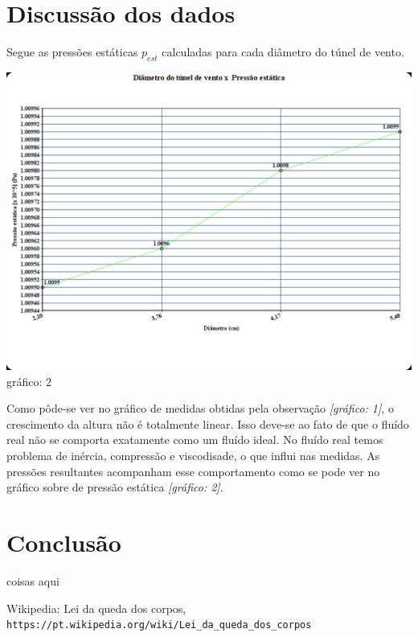 \documentclass[a4paper]{article}
\begin{document}
\section{Discussão dos dados}
    Segue as pressões estáticas $p_{est}$ calculadas para cada diâmetro do túnel de vento.
        \begin{center}
              \includegraphics[width=\linewidth]{img/graphPression.png}
              \label{graph}{gráfico: 2}
        \end{center}

        Como pôde-se ver no gráfico de medidas obtidas pela observação \textit{[gráfico: 1]}, o crescimento da altura não é totalmente linear. Isso deve-se ao fato de que o fluído real não se comporta exatamente como um fluído ideal. No fluído real temos problema de inércia, compressão e viscodisade, o que influi nas medidas. As pressões resultantes acompanham esse comportamento como se pode ver no gráfico sobre de pressão estática \textit{[gráfico: 2]}.

\section{Conclusão}
    coisas aqui

\begin{thebibliography}{1}

    Wikipedia: Lei da queda dos corpos,
    \\\texttt{https://pt.wikipedia.org/wiki/Lei\_da\_queda\_dos\_corpos}
\end{thebibliography}
\end{document}
